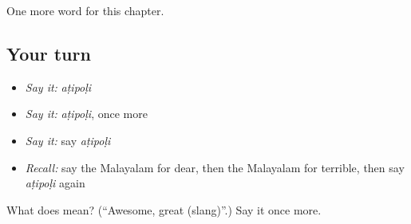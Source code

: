 \begin{grammarlens}[title={What you've built}]
One more word for this chapter.
\end{grammarlens}

\subsection*{Your turn}
\begin{itemize}
\raggedright
  \item \emph{Say it:} \emph{aṭipoḷi}
  \item \emph{Say it:} \emph{aṭipoḷi}, once more
  \item \emph{Say it:} say \emph{aṭipoḷi}
  \item \emph{Recall:} say the Malayalam for dear, then the Malayalam for terrible, then say \emph{aṭipoḷi} again
\end{itemize}

\begin{tcolorbox}[breakable,colback=teal!4,colframe=teal!35!black,title={Before you move on}]
What does  mean? (\textquotedblleft{}Awesome, great (slang)\textquotedblright{}.) Say it once more.
\end{tcolorbox}

